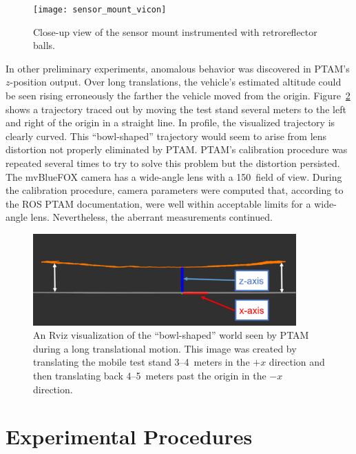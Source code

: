 \begin{figure}
  \centering
    \texttt{[image: sensor\_mount\_vicon]}
  \caption[Sensor Mount Instrumented with Retroreflectors]{Close-up view of the sensor mount instrumented with retroreflector balls.}
  \label{fig:sensor_mount_vicon}
\end{figure}

In other preliminary experiments, anomalous behavior was discovered in PTAM's $z$-position output. Over long translations, the vehicle's estimated altitude could be seen rising erroneously the farther the vehicle moved from the origin. Figure~\ref{fig:bowl-shaped_world} shows a trajectory traced out by moving the test stand several meters to the left and right of the origin in a straight line. In profile, the visualized trajectory is clearly curved. This ``bowl-shaped'' trajectory would seem to arise from lens distortion not properly eliminated by PTAM. PTAM's calibration procedure was repeated several times to try to solve this problem but the distortion persisted. The mvBlueFOX camera has a wide-angle lens with a 150\textdegree\ field of view. During the calibration procedure, camera parameters were computed that, according to the ROS PTAM documentation, were well within acceptable limits for a wide-angle lens. Nevertheless, the aberrant measurements continued.

\begin{figure}[H]
  \centering
    \includegraphics[width=0.9\textwidth]{bowl-shaped_world}
  \caption[Rviz Visualization of Translational (Lens) Distortion]{An Rviz visualization of the ``bowl-shaped'' world seen by PTAM during a long translational motion. This image was created by translating the mobile test stand 3--4~meters in the $+x$ direction and then translating back 4--5~meters past the origin in the $-x$ direction.}
  \label{fig:bowl-shaped_world}
\end{figure}

\section{Experimental Procedures}

